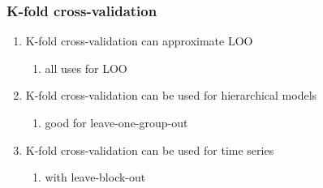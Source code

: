 \documentclass[10pt]{beamer}
\begin{document}
\begin{frame}{}

\frametitle{ K-fold cross-validation}

\begin{enumerate}
\item K-fold cross-validation can approximate LOO
  \begin{enumerate}
    \item all uses for LOO
  \end{enumerate}
\item K-fold cross-validation can be used for hierarchical models
  \begin{enumerate}
    \item good for leave-one-group-out
  \end{enumerate}
\item K-fold cross-validation can be used for time series
  \begin{enumerate}
    \item with leave-block-out
  \end{enumerate}
\end{enumerate}

\end{frame}
\end{document}
